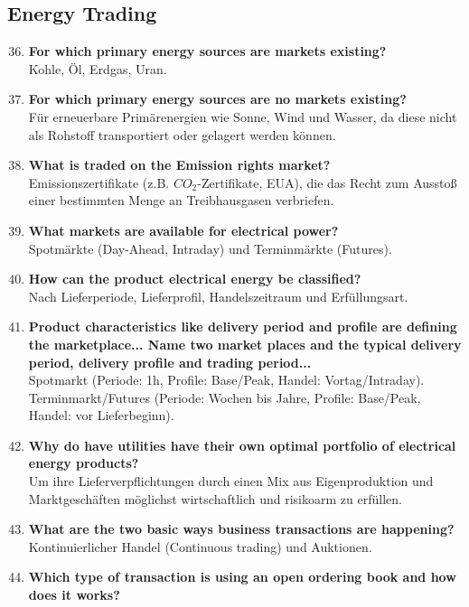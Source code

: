 \documentclass{article}
\begin{document}
\subsection*{Energy Trading}
\begin{enumerate}
    \setcounter{enumi}{35}
    \item \textbf{For which primary energy sources are markets existing?} \\
    Kohle, Öl, Erdgas, Uran.
    \item \textbf{For which primary energy sources are no markets existing?} \\
    Für erneuerbare Primärenergien wie Sonne, Wind und Wasser, da diese nicht als Rohstoff transportiert oder gelagert werden können.
    \item \textbf{What is traded on the Emission rights market?} \\
    Emissionszertifikate (z.B. $CO_2$-Zertifikate, EUA), die das Recht zum Ausstoß einer bestimmten Menge an Treibhausgasen verbriefen.
    \item \textbf{What markets are available for electrical power?} \\
    Spotmärkte (Day-Ahead, Intraday) und Terminmärkte (Futures).
    \item \textbf{How can the product electrical energy be classified?} \\
    Nach Lieferperiode, Lieferprofil, Handelszeitraum und Erfüllungsart.
    \item \textbf{Product characteristics like delivery period and profile are defining the marketplace... Name two market places and the typical delivery period, delivery profile and trading period...} \\
    Spotmarkt (Periode: 1h, Profile: Base/Peak, Handel: Vortag/Intraday). Terminmarkt/Futures (Periode: Wochen bis Jahre, Profile: Base/Peak, Handel: vor Lieferbeginn).
    \item \textbf{Why do have utilities have their own optimal portfolio of electrical energy products?} \\
    Um ihre Lieferverpflichtungen durch einen Mix aus Eigenproduktion und Marktgeschäften möglichst wirtschaftlich und risikoarm zu erfüllen.
    \item \textbf{What are the two basic ways business transactions are happening?} \\
    Kontinuierlicher Handel (Continuous trading) und Auktionen.
    \item \textbf{Which type of transaction is using an open ordering book and how does it works?} \\

\end{enumerate}
\end{document}
